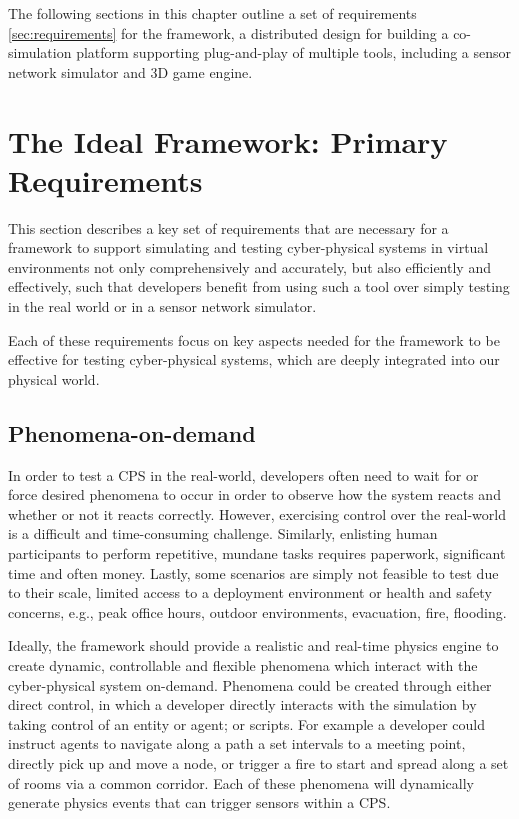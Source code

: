 The following sections in this chapter outline a set of requirements \ref{sec:requirements} for the framework, a distributed design for building a co-simulation platform supporting plug-and-play of multiple tools, including a sensor network simulator and 3D game engine.


\section{The Ideal Framework: Primary Requirements}
\label{sec:Requirements}
This section describes a key set of requirements that are necessary for a framework to support simulating and testing cyber-physical systems in virtual environments not only comprehensively and accurately, but also efficiently and effectively, such that developers benefit from using such a tool over simply testing in the real world or in a sensor network simulator.

Each of these requirements focus on key aspects needed for the framework to be effective for testing cyber-physical systems, which are deeply integrated into our physical world.



\subsection{Phenomena-on-demand}
\label{sub:requirements_Phenomena-on-demand}
In order to test a CPS in the real-world, developers often need to wait for or force desired phenomena to occur in order to observe how the system reacts and whether or not it reacts correctly. However, exercising control over the real-world is a difficult and time-consuming challenge. Similarly, enlisting human participants to perform repetitive, mundane tasks requires paperwork, significant time and often money. Lastly, some scenarios are simply not feasible to test due to their scale, limited access to a deployment environment or health and safety concerns, e.g., peak office hours, outdoor environments, evacuation, fire, flooding.

Ideally, the framework should provide a realistic and real-time physics engine to create dynamic, controllable and flexible phenomena which interact with the cyber-physical system on-demand. Phenomena could be created through either direct control, in which a developer directly interacts with the simulation by taking control of an entity or agent; or scripts. For example a developer could instruct agents to navigate along a path a set intervals to a meeting point, directly pick up and move a node, or trigger a fire to start and spread along a set of rooms via a common corridor. Each of these phenomena will dynamically generate physics events that can trigger sensors within a CPS.

